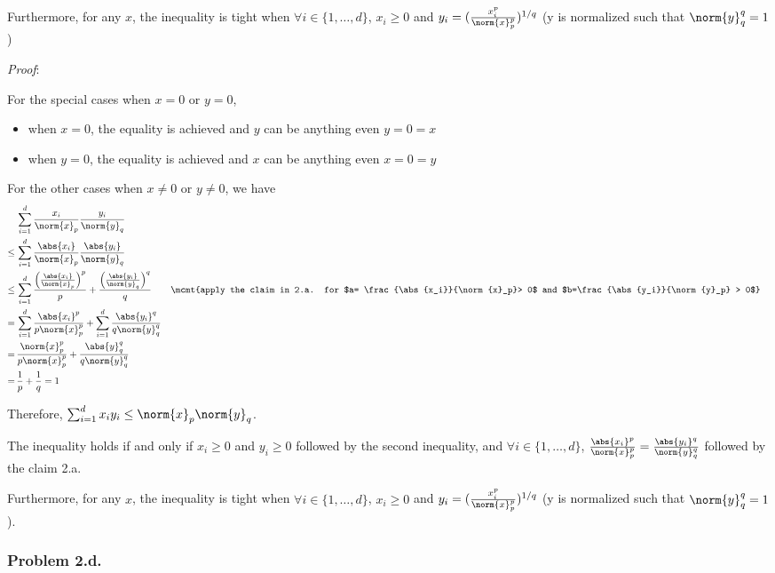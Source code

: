 Furthermore, for any $x$, the inequality is tight when $\forall i \in \{1,\ldots,d\}$, $x_i \ge 0$ and $y_i = (\frac{x_i^p}{\norm{x}_p^p})^{1/q}$ (y is normalized such that $\norm{y}_q^q = 1$)

\textit{Proof}:

For the special cases when $x = 0$ or $y = 0$,
\begin{itemize}
\item when $x = 0$, the equality is achieved and $y$ can be anything even $y = 0 = x$
\item when $y = 0$, the equality is achieved and $x$ can be anything even $x = 0 = y$
\end{itemize}

For the other cases when $x \neq 0$ or $y \neq 0$, we have
\begin{align*}
  & \sum_{i=1}^d \frac{x_i}{\norm{x}_p}\frac{y_i}{\norm{y}_q} \\
  \le\,& \sum_{i=1}^d \frac{\abs{x_i}}{\norm{x}_p}\frac{\abs{y_i}}{\norm{y}_q} \\
  \le\,& \sum_{i=1}^d \frac{\left( \frac{\abs{x_i}}{\norm{x}_p} \right)^p}{p} + \frac{\left( \frac{\abs{y_i}}{\norm{y}_q} \right)^q}{q} && \mcmt{apply the claim in 2.a. for $a= \frac{\abs{x_i}}{\norm{x}_p}> 0$ and $b=\frac{\abs{y_i}}{\norm{y}_p} > 0$}\\
  =\,& \sum_{i=1}^d \frac{\abs{x_i}^p}{p\norm{x}_p^p} + \sum_{i=1}^d \frac{\abs{y_i}^q}{q\norm{y}_q^q} \\
  =\,& \frac{\norm{x}_p^p}{p\norm{x}_p^p} + \frac{\abs{y}_q^q}{q\norm{y}_q^q} \\
  =\,& \frac{1}{p} + \frac{1}{q} = 1
\end{align*}

Therefore, $\sum_{i=1}^d x_iy_i \le \norm{x}_p\norm{y}_q$.

The inequality holds if and only if $x_i \ge 0$ and $y_i \ge 0$ followed by the second inequality, and $\forall i \in \{1,\ldots,d\}$, $\frac{\abs{x_i}^p}{\norm{x}_p^p} = \frac{\abs{y_i}^q}{\norm{y}_q^q}$ followed by the claim 2.a.

Furthermore, for any $x$, the inequality is tight when $\forall i \in \{1,\ldots,d\}$, $x_i \ge 0$ and $y_i = (\frac{x_i^p}{\norm{x}_p^p})^{1/q}$ (y is normalized such that $\norm{y}_q^q = 1$).

\subsubsection*{Problem 2.d.}

